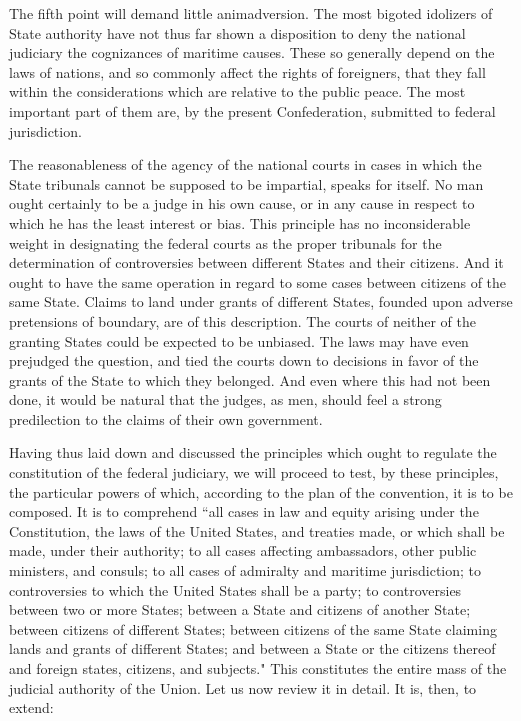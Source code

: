 The fifth point will demand little animadversion. The most bigoted idolizers of State authority have not thus far shown a disposition to deny the national judiciary the cognizances of maritime causes. These so generally depend on the laws of nations, and so commonly affect the rights of foreigners, that they fall within the considerations which are relative to the public peace. The most important part of them are, by the present Confederation, submitted to federal jurisdiction.

The reasonableness of the agency of the national courts in cases in which the State tribunals cannot be supposed to be impartial, speaks for itself. No man ought certainly to be a judge in his own cause, or in any cause in respect to which he has the least interest or bias. This principle has no inconsiderable weight in designating the federal courts as the proper tribunals for the determination of controversies between different States and their citizens. And it ought to have the same operation in regard to some cases between citizens of the same State. Claims to land under grants of different States, founded upon adverse pretensions of boundary, are of this description. The courts of neither of the granting States could be expected to be unbiased. The laws may have even prejudged the question, and tied the courts down to decisions in favor of the grants of the State to which they belonged. And even where this had not been done, it would be natural that the judges, as men, should feel a strong predilection to the claims of their own government.

Having thus laid down and discussed the principles which ought to regulate the constitution of the federal judiciary, we will proceed to test, by these principles, the particular powers of which, according to the plan of the convention, it is to be composed. It is to comprehend ``all cases in law and equity arising under the Constitution, the laws of the United States, and treaties made, or which shall be made, under their authority; to all cases affecting ambassadors, other public ministers, and consuls; to all cases of admiralty and maritime jurisdiction; to controversies to which the United States shall be a party; to controversies between two or more States; between a State and citizens of another State; between citizens of different States; between citizens of the same State claiming lands and grants of different States; and between a State or the citizens thereof and foreign states, citizens, and subjects." This constitutes the entire mass of the judicial authority of the Union. Let us now review it in detail. It is, then, to extend:


